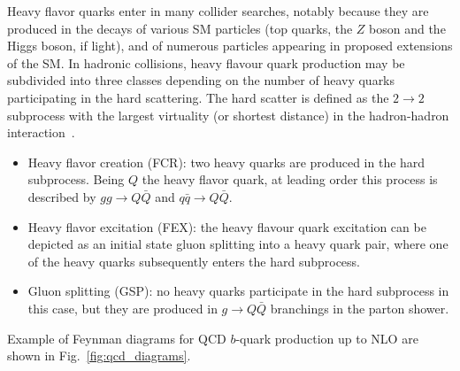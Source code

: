 Heavy flavor quarks enter in many collider searches, notably because they are produced in the decays of various SM particles (top quarks, the $Z$ boson and the Higgs boson, if light), and of numerous particles appearing in proposed extensions of the SM.
 In hadronic collisions, heavy flavour quark production may be subdivided into three classes depending on the number of heavy quarks participating in the hard scattering. The hard scatter is defined as the $2 \rightarrow 2$ subprocess with the largest virtuality (or shortest distance) in the hadron-hadron interaction~\cite{Norrbin:2000zc}.



\begin{itemize}\addtolength{\itemsep}{-0.4\baselineskip}
\item
Heavy flavor creation (FCR): two heavy quarks are produced in the hard subprocess. Being $Q$ the heavy flavor quark, at leading order this process is described by $gg \rightarrow Q\bar{Q}$ and  $q\bar{q} \rightarrow Q\bar{Q}$.
\item
Heavy flavor excitation (FEX): the heavy flavour quark excitation can be depicted as an initial state gluon splitting into a heavy quark pair, where one of the heavy quarks subsequently enters the hard subprocess.
\item
Gluon splitting (GSP): no heavy quarks participate in the hard subprocess in this case, but they are produced in $g \rightarrow Q\bar{Q}$ branchings in the parton shower.
\end{itemize}

Example of Feynman diagrams for QCD $b$-quark production up to NLO are shown in Fig.~\ref{fig:qcd_diagrams}.

